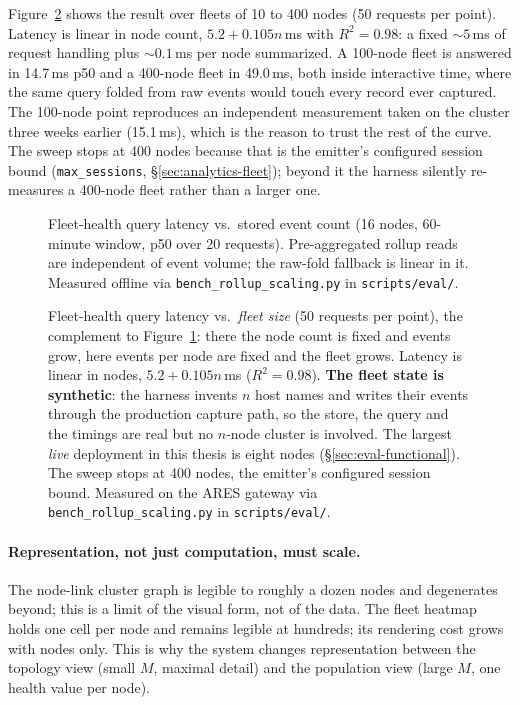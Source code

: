 Figure~\ref{fig:fleet-nodes} shows the result over fleets of 10 to 400
nodes (50 requests per point). Latency is linear in node count,
$5.2 + 0.105n$\,ms with $R^2 = 0.98$: a fixed ${\sim}5$\,ms of request
handling plus ${\sim}0.1$\,ms per node summarized. A 100-node fleet is
answered in 14.7\,ms p50 and a 400-node fleet in 49.0\,ms, both inside
interactive time, where the same query folded from raw events would touch
every record ever captured. The 100-node point reproduces an
independent measurement taken on the cluster three weeks earlier
(15.1\,ms), which is the reason to trust the rest of the curve. The sweep
stops at 400 nodes because that is the emitter's configured session bound
(\texttt{max\_sessions}, \S\ref{sec:analytics-fleet}); beyond it the
harness silently re-measures a 400-node fleet rather than a larger one.

\begin{figure}[t]
  \centering
  
  \caption[Fleet-query latency vs.\ stored event count]{Fleet-health query latency vs.\ stored event count (16 nodes,
  60-minute window, p50 over 20 requests). Pre-aggregated rollup reads
  are independent of event volume; the raw-fold fallback is linear in
  it. Measured offline via
  \texttt{bench\_rollup\_\allowbreak scaling.py} in
  \texttt{scripts/eval/}.}
  \label{fig:rollup-scaling}
\end{figure}

\begin{figure}[t]
  \centering
  
  \caption[Fleet-query latency vs.\ fleet size]{Fleet-health query latency
  vs.\ \emph{fleet size} (50 requests per point), the complement to
  Figure~\ref{fig:rollup-scaling}: there the node count is fixed and events
  grow, here events per node are fixed and the fleet grows. Latency is
  linear in nodes, $5.2 + 0.105n$\,ms ($R^2 = 0.98$).
  \textbf{The fleet state is synthetic}: the harness invents $n$ host names
  and writes their events through the production capture path, so the store,
  the query and the timings are real but no $n$-node cluster is involved.
  The largest \emph{live} deployment in this thesis is eight nodes
  (\S\ref{sec:eval-functional}). The sweep stops at 400 nodes, the emitter's
  configured session bound. Measured on the ARES gateway via
  \texttt{bench\_rollup\_\allowbreak scaling.py} in \texttt{scripts/eval/}.}
  \label{fig:fleet-nodes}
\end{figure}

\paragraph{Representation, not just computation, must scale.} The
node-link cluster graph is legible to roughly a dozen nodes and
degenerates beyond; this is a limit of the visual form, not of the
data. The fleet heatmap holds one cell per node and remains legible at
hundreds; its rendering cost grows with nodes only. This is why the
system changes representation between the topology view (small $M$, maximal
detail) and the population view (large $M$, one health value per node).

